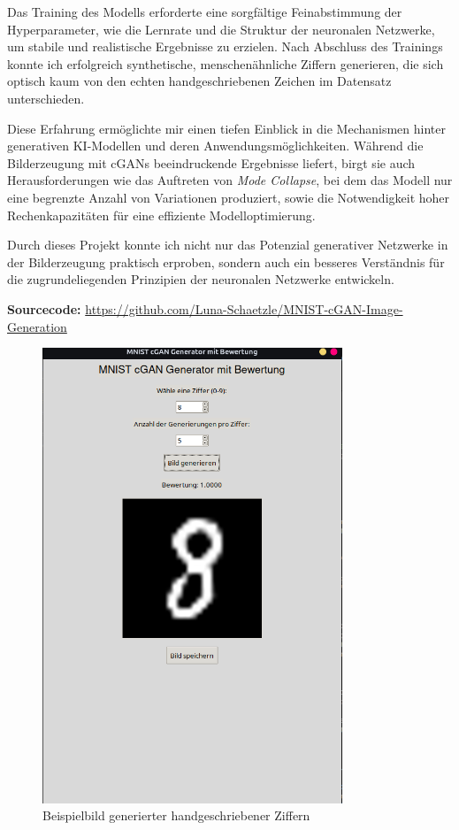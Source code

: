 \documentclass[a4paper,12pt]{article}
\begin{document}
Das Training des Modells erforderte eine sorgfältige Feinabstimmung der Hyperparameter, wie die Lernrate und die Struktur der neuronalen Netzwerke, um stabile und realistische Ergebnisse zu erzielen. Nach Abschluss des Trainings konnte ich erfolgreich synthetische, menschenähnliche Ziffern generieren, die sich optisch kaum von den echten handgeschriebenen Zeichen im Datensatz unterschieden.

Diese Erfahrung ermöglichte mir einen tiefen Einblick in die Mechanismen hinter generativen KI-Modellen und deren Anwendungsmöglichkeiten. Während die Bilderzeugung mit cGANs beeindruckende Ergebnisse liefert, birgt sie auch Herausforderungen wie das Auftreten von \textit{Mode Collapse}, bei dem das Modell nur eine begrenzte Anzahl von Variationen produziert, sowie die Notwendigkeit hoher Rechenkapazitäten für eine effiziente Modelloptimierung.

Durch dieses Projekt konnte ich nicht nur das Potenzial generativer Netzwerke in der Bilderzeugung praktisch erproben, sondern auch ein besseres Verständnis für die zugrundeliegenden Prinzipien der neuronalen Netzwerke entwickeln.

\vspace{0.5cm} \noindent \textbf{Sourcecode:} \url{https://github.com/Luna-Schaetzle/MNIST-cGAN-Image-Generation}

\begin{figure}[h]
    \centering
    \includegraphics[width=0.8\textwidth]{image.png}
    \caption{Beispielbild generierter handgeschriebener Ziffern}
    \label{fig:example}
\end{figure}
\end{document}
